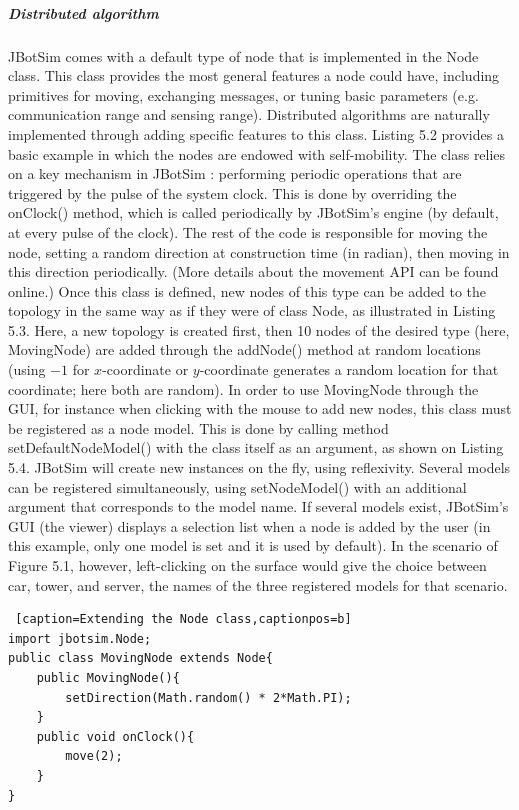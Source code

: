 \subparagraph{Distributed algorithm} JBotSim  comes with a default type of node that is implemented in the Node class. This class provides the most general features a node could have, including primitives for moving, exchanging messages, or tuning basic parameters (e.g. communication range and sensing range). Distributed algorithms are naturally implemented through adding specific features to this class. Listing 5.2 provides a basic example in which the nodes are endowed with self-mobility. The class relies on a key mechanism in  JBotSim : performing periodic operations that are triggered by the pulse of the system clock. This is done by overriding the onClock() method, which is called periodically by JBotSim’s engine (by default, at every pulse of the clock). The rest of the code is responsible for moving the node, setting a random direction at construction time (in radian), then moving in this direction periodically. (More details about the movement API can be found online.) Once this class is defined, new nodes of this type can be added to the topology in the same way as if they were of class Node, as illustrated in Listing 5.3. Here, a new topology is created first, then 10 nodes of the desired type (here, MovingNode) are added through the addNode() method at random locations (using $-1$ for $x$-coordinate or $y$-coordinate generates a random location for that coordinate; here both are random). In order to use MovingNode through the GUI, for instance when clicking with the mouse to add new nodes, this class must be registered as a node model. This is done by calling method setDefaultNodeModel() with the class itself as an argument, as shown on Listing 5.4. JBotSim will create new instances on the fly, using reflexivity. Several models can be registered simultaneously, using setNodeModel() with an additional argument that corresponds to the model name. If several models exist, JBotSim’s GUI (the viewer) displays a selection list when a node is added by the user (in this example, only one model is set and it is used by default). In the scenario of Figure 5.1, however, left-clicking on the surface would give the choice between car, tower, and server, the names of the three registered models for that scenario.
\begin{lstlisting} [caption=Extending the Node class,captionpos=b]
import jbotsim.Node;
public class MovingNode extends Node{
	public MovingNode(){
		setDirection(Math.random() * 2*Math.PI);
	}
	public void onClock(){
		move(2);
	}
}
\end{lstlisting}

